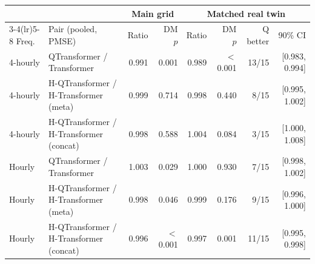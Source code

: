 \begin{tabular}{llrrrrrr}
\toprule
 & & \multicolumn{2}{c}{Main grid} & \multicolumn{4}{c}{Matched real twin} \\
\cmidrule(lr){3-4}\cmidrule(lr){5-8}
Freq. & Pair (pooled, PMSE) & Ratio & DM $p$ & Ratio & DM $p$ & Q better & 90\% CI \\
\midrule
4-hourly & QTransformer / Transformer & 0.991 & 0.001 & 0.989 & $<$0.001 & 13/15 & [0.983, 0.994] \\
4-hourly & H-QTransformer / H-Transformer (meta) & 0.999 & 0.714 & 0.998 & 0.440 & 8/15 & [0.995, 1.002] \\
4-hourly & H-QTransformer / H-Transformer (concat) & 0.998 & 0.588 & 1.004 & 0.084 & 3/15 & [1.000, 1.008] \\
Hourly & QTransformer / Transformer & 1.003 & 0.029 & 1.000 & 0.930 & 7/15 & [0.998, 1.002] \\
Hourly & H-QTransformer / H-Transformer (meta) & 0.998 & 0.046 & 0.999 & 0.176 & 9/15 & [0.996, 1.000] \\
Hourly & H-QTransformer / H-Transformer (concat) & 0.996 & $<$0.001 & 0.997 & 0.001 & 11/15 & [0.995, 0.998] \\
\bottomrule
\end{tabular}
